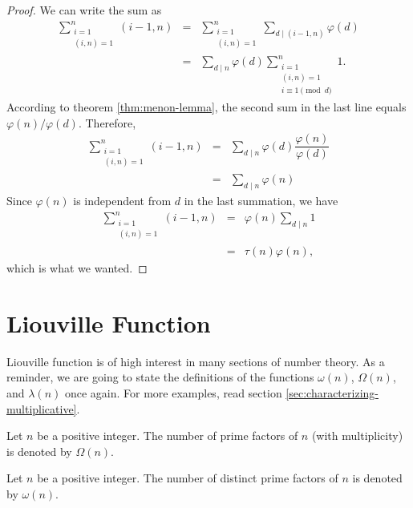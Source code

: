 \documentclass[12pt]{subfile}
\begin{document}
		\begin{proof}
			We can write the sum as
				\begin{eqnarray*}
					\sum\limits_{\substack{i=1\\(i,n)=1}}^{n}(i-1,n)
					& = & \sum\limits_{\substack{i=1\\(i,n)=1}}^{n}\sum\limits_{d\mid(i-1,n)}\varphi(d)\\
					& = & \sum\limits_{d\mid n}\varphi(d)\sum\limits_{\substack{i=1\\(i,n)=1\\i\equiv 1\pmod d}}^n 1.
				\end{eqnarray*}
			According to theorem \ref{thm:menon-lemma}, the second sum in the last line equals $\varphi(n)/\varphi(d)$. Therefore,
				\begin{eqnarray*}
					\sum\limits_{\substack{i=1\\(i,n)=1}}^{n}(i-1,n)
					& = & \sum\limits_{d\mid n}\varphi(d)\dfrac{\varphi(n)}{\varphi(d)}\\
					& = & \sum\limits_{d\mid n}\varphi(n)
				\end{eqnarray*}
			Since $\varphi(n)$ is independent from $d$ in the last summation, we have
				\begin{eqnarray*}
					\sum\limits_{\substack{i=1\\(i,n)=1}}^{n}(i-1,n)
					& = & \varphi(n)\sum\limits_{d\mid n}1\\
					& = & \tau(n)\varphi(n),
				\end{eqnarray*}
			which is what we wanted.
		\end{proof}
\section{Liouville Function}
	Liouville function is of high interest in many sections of number theory. As a reminder, we are going to state the definitions of the functions $\omega(n)$, $\Omega(n)$, and $\lambda(n)$ once again. For more examples, read section \ref{sec:characterizing-multiplicative}.

	\begin{definition}
		Let $n$ be a positive integer. The number of prime factors of $n$ (with multiplicity) is denoted by $\Omega(n)$.
	\end{definition}

	\begin{definition}
		Let $n$ be a positive integer. The number of distinct prime factors of $n$ is denoted by $\omega(n)$.
	\end{definition}
\end{document}

